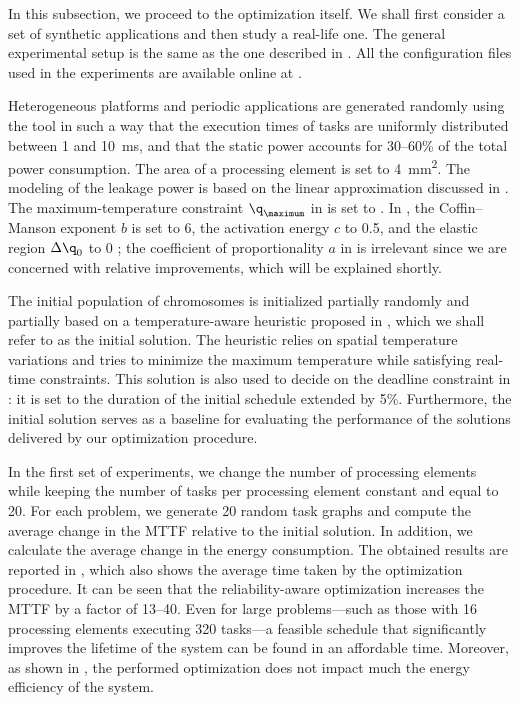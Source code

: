 In this subsection, we proceed to the optimization itself. We shall first
consider a set of synthetic applications and then study a real-life one. The
general experimental setup is the same as the one described in
. All the configuration files used in the
experiments are available online at \cite{eslab2011}.

Heterogeneous platforms and periodic applications are generated randomly using
the  tool \cite{dick1998} in such a way that the execution times of
tasks are uniformly distributed between 1 and 10~ms, and that the static power
accounts for 30--60\% of the total power consumption. The area of a processing
element is set to 4~mm\textsuperscript{2}. The modeling of the leakage power is
based on the linear approximation discussed in
. The maximum-temperature constraint
$\q_\maximum$ in  is set to . In
, the Coffin--Manson exponent $b$ is set to 6, the
activation energy $c$ to 0.5, and the elastic region $\Delta \q_0$ to 0
\cite{jedec2010}; the coefficient of proportionality $a$ in
 is irrelevant since we are concerned with
relative improvements, which will be explained shortly.

The initial population of chromosomes is initialized partially randomly and
partially based on a temperature-aware heuristic proposed in \cite{xie2006},
which we shall refer to as the initial solution. The heuristic relies on spatial
temperature variations and tries to minimize the maximum temperature while
satisfying real-time constraints. This solution is also used to decide on the
deadline constraint \period in : it is set to
the duration of the initial schedule extended by 5\%. Furthermore, the initial
solution serves as a baseline for evaluating the performance of the solutions
delivered by our optimization procedure.

In the first set of experiments, we change the number of processing elements \np
while keeping the number of tasks \nt per processing element constant and equal
to 20. For each problem, we generate 20 random task graphs and compute the
average change in the \ac{MTTF} relative to the initial solution. In addition,
we calculate the average change in the energy consumption. The obtained results
are reported in , which also shows the average
time taken by the optimization procedure. It can be seen that the
reliability-aware optimization increases the \ac{MTTF} by a factor of 13--40.
Even for large problems---such as those with 16 processing elements executing
320 tasks---a feasible schedule that significantly improves the lifetime of the
system can be found in an affordable time. Moreover, as shown in
, the performed optimization does not impact much
the energy efficiency of the system.


